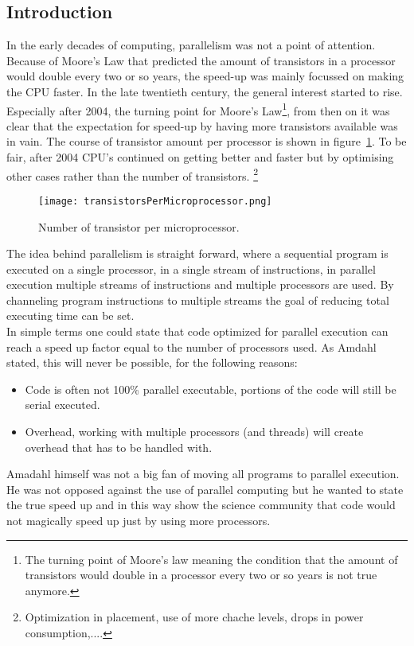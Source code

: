 \subsection{Introduction}
In the early decades of computing, parallelism was not a point of attention.
Because of Moore's Law that predicted the amount of transistors in a processor would double every two or so years, the speed-up was mainly focussed on making the CPU faster.
In the late twentieth century, the general interest started to rise. 
Especially after 2004, the turning point for Moore's Law\footnote{The turning point of Moore's law meaning the condition that the amount of transistors would double in a processor every two or so years is not true anymore.}, from then on it was clear that the expectation for speed-up by having more transistors available was in vain.
The course of transistor amount per processor is shown in figure~\ref{fig:Moore}.\cite{rupp_2015}
To be fair, after 2004 CPU's continued on getting better and faster but by optimising other cases rather than the number of transistors. \footnote{Optimization in placement, use of more chache levels, drops in power consumption,....}
\begin{figure}[H]
	\centering
	\texttt{[image: transistorsPerMicroprocessor.png]}
	\caption{Number of transistor per microprocessor.\cite{rupp_2015}}
	\label{fig:Moore}
\end{figure}
The idea behind parallelism is straight forward, where a sequential program is executed on a single processor, in a single stream of instructions, in parallel execution multiple streams of instructions and multiple processors are used.
By channeling program instructions to multiple streams the goal of reducing total executing time can be set.\\
In simple terms one could state that code optimized for parallel execution can reach a speed up factor equal to the number of processors used.
As Amdahl stated, this will never be possible, for the following reasons:
\begin{itemize}
	\item Code is often not 100\% parallel executable, portions of the code will still be serial executed.
	\item Overhead, working with multiple processors (and threads) will create overhead that has to be handled with.
\end{itemize}
Amadahl himself was not a big fan of moving all programs to parallel execution.
He was not opposed against the use of parallel computing but he wanted to state the true speed up and in this way show the science community that code would not magically speed up just by using more processors.
